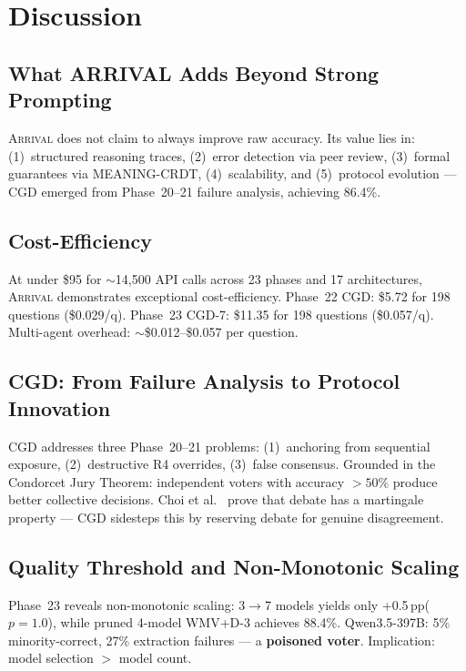 \documentclass[11pt,a4paper]{article}
\newcommand{\arrival}{\textsc{Arrival}\xspace}
\newcommand{\pp}{\,pp\xspace}
\begin{document}
\clearpage
\section{Discussion}\label{sec:discussion}

\subsection{What ARRIVAL Adds Beyond Strong Prompting}

\arrival does not claim to always improve raw accuracy.  Its value
lies in: (1)~structured reasoning traces, (2)~error detection via
peer review, (3)~formal guarantees via MEANING-CRDT, (4)~scalability,
and (5)~protocol evolution — CGD emerged from Phase~20--21 failure
analysis, achieving 86.4\%.

\subsection{Cost-Efficiency}

At under \$95 for $\sim$14,500 API calls across 23 phases and 17
architectures, \arrival demonstrates exceptional cost-efficiency.
Phase~22 CGD: \$5.72 for 198 questions (\$0.029/q).
Phase~23 CGD-7: \$11.35 for 198 questions (\$0.057/q).
Multi-agent overhead: $\sim$\$0.012--\$0.057 per question.

\subsection{CGD: From Failure Analysis to Protocol Innovation}

CGD addresses three Phase~20--21 problems: (1)~anchoring from
sequential exposure, (2)~destructive R4 overrides, (3)~false
consensus.  Grounded in the Condorcet Jury Theorem: independent
voters with accuracy $>50\%$ produce better collective decisions.
Choi et al.~\cite{choi2025debate} prove that debate has a martingale
property — CGD sidesteps this by reserving debate for genuine
disagreement.

\subsection{Quality Threshold and Non-Monotonic Scaling}

Phase~23 reveals non-monotonic scaling: 3$\to$7 models yields only
+0.5\pp ($p=1.0$), while pruned 4-model WMV+D-3 achieves 88.4\%.
Qwen3.5-397B: 5\% minority-correct, 27\% extraction failures —
a \textbf{poisoned voter}.  Implication: model selection $>$ model
count.
\end{document}
